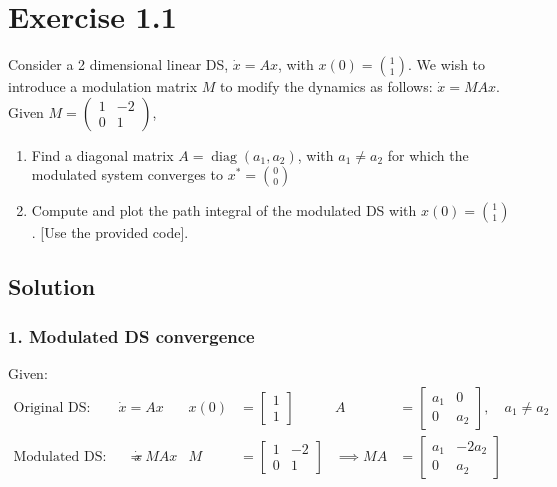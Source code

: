 \section*{Exercise 1.1}

Consider a 2 dimensional linear DS, \( \dot{x}=A x \), with \( x(0)=\binom{1}{1} \).
We wish to introduce a modulation matrix \( M \) to modify the dynamics as follows: \( \dot{x}=M A x \).
Given \( M=\left(\begin{array}{cc}1 & -2 \\ 0 & 1\end{array}\right) \),
\begin{enumerate}[noitemsep]
  \item Find a diagonal matrix \( A=\operatorname{diag}\left(a_{1}, a_{2}\right) \), with \( a_{1} \neq a_{2} \) for which the modulated system converges to \( x^{*}=\binom{0}{0} \)
  \item Compute and plot the path integral of the modulated DS with \( x(0)=\binom{1}{1} \). [Use the provided code].
\end{enumerate}

\subsection*{Solution}

\subsubsection*{1. Modulated DS convergence}

Given:
\begin{align*}
  \text{Original DS:}
  \qquad
  \dot{x}
    & = A x
    &
  x(0)
    & =
  \begin{bmatrix} 1 \\ 1 \end{bmatrix}
    &
  A
    & =
  \begin{bmatrix} a_1 & 0 \\ 0 & a_2 \end{bmatrix},
  \quad a_1 \neq a_2
  \\
  \text{Modulated DS:}
  \qquad
  \dot{x}
    & =
  M A x
    &
  M & =
  \begin{bmatrix} 1 & -2 \\ 0 & 1 \end{bmatrix}
    &
  \implies
  M A
    & =
  \begin{bmatrix} a_1 & -2 a_2 \\ 0 & a_2 \end{bmatrix}
\end{align*}

